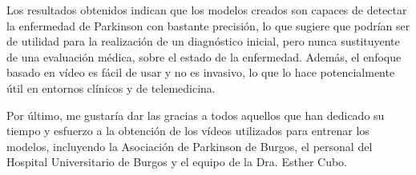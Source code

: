 Los resultados obtenidos indican que los modelos creados son capaces de detectar
la enfermedad de Parkinson con bastante precisión, lo que sugiere que podrían
ser de utilidad para la realización de un diagnóstico inicial, pero nunca
sustituyente de una evaluación médica, sobre el estado de la enfermedad. Además,
el enfoque basado en vídeo es fácil de usar y no es invasivo, lo que lo hace
potencialmente útil en entornos clínicos y de telemedicina.

Por último, me gustaría dar las gracias a todos aquellos que han dedicado su
tiempo y esfuerzo a la obtención de los vídeos utilizados para entrenar los
modelos, incluyendo la Asociación de Parkinson de Burgos, el personal del
Hospital Universitario de Burgos y el equipo de la Dra. Esther Cubo.
